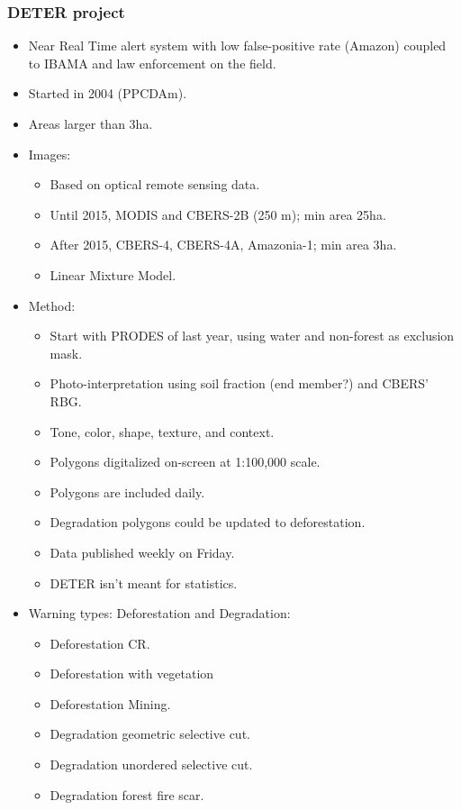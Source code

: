\documentclass{beamer}
\begin{document}
\begin{frame}[t, allowframebreaks]
    \frametitle{DETER project~\cite{dealmeida2022}}
    \begin{itemize}
        \item Near Real Time alert system with low false-positive rate 
            (Amazon) coupled to IBAMA and law enforcement on the field. 
        \item Started in 2004 (PPCDAm).
        \item Areas larger than 3ha.
        \item Images:
        \begin{itemize}
            \item Based on optical remote sensing data.
            \item Until 2015, MODIS and CBERS-2B (250 m); min area 25ha.
            \item After 2015, CBERS-4, CBERS-4A, Amazonia-1; min area 3ha.
            \item Linear Mixture Model.
        \end{itemize}
        \item Method:
        \begin{itemize}
            \item Start with PRODES of last year, using water and 
                non-forest as exclusion mask.
            \item Photo-interpretation using soil fraction (end member?)
                and CBERS' RBG.
            \item Tone, color, shape, texture, and context.
            \item Polygons digitalized on-screen at 1:100,000 scale.
            \item Polygons are included daily. 
            \item Degradation polygons could be updated to deforestation.
            \item Data published weekly on Friday.
            \item DETER isn't meant for statistics.
        \end{itemize}
        \item Warning types: Deforestation and Degradation:
        \begin{itemize}
            \item Deforestation CR.
            \item Deforestation with vegetation
            \item Deforestation Mining.
            \item Degradation geometric selective cut.
            \item Degradation unordered selective cut.
            \item Degradation forest fire scar.
        \end{itemize}
    \end{itemize}
\end{frame}
\end{document}
